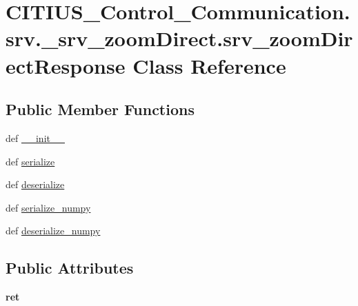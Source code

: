 \hypertarget{class_c_i_t_i_u_s___control___communication_1_1srv_1_1__srv__zoom_direct_1_1srv__zoom_direct_response}{\section{\-C\-I\-T\-I\-U\-S\-\_\-\-Control\-\_\-\-Communication.\-srv.\-\_\-srv\-\_\-zoom\-Direct.\-srv\-\_\-zoom\-Direct\-Response \-Class \-Reference}
\label{class_c_i_t_i_u_s___control___communication_1_1srv_1_1__srv__zoom_direct_1_1srv__zoom_direct_response}
}
\subsection*{\-Public \-Member \-Functions}
\begin{DoxyCompactItemize}
\item 
def \hyperlink{class_c_i_t_i_u_s___control___communication_1_1srv_1_1__srv__zoom_direct_1_1srv__zoom_direct_response_a1d389804d3151431233b57c0e249b71a}{\-\_\-\-\_\-init\-\_\-\-\_\-}
\item 
def \hyperlink{class_c_i_t_i_u_s___control___communication_1_1srv_1_1__srv__zoom_direct_1_1srv__zoom_direct_response_af896cc808c16691134cea64dc5f87729}{serialize}
\item 
def \hyperlink{class_c_i_t_i_u_s___control___communication_1_1srv_1_1__srv__zoom_direct_1_1srv__zoom_direct_response_ae158c3f8915a4008de44492544191a4e}{deserialize}
\item 
def \hyperlink{class_c_i_t_i_u_s___control___communication_1_1srv_1_1__srv__zoom_direct_1_1srv__zoom_direct_response_a03500c731ac2850c892e61a1d8ece8f9}{serialize\-\_\-numpy}
\item 
def \hyperlink{class_c_i_t_i_u_s___control___communication_1_1srv_1_1__srv__zoom_direct_1_1srv__zoom_direct_response_abeea783c97af18c3ed509fffbe8f959a}{deserialize\-\_\-numpy}
\end{DoxyCompactItemize}
\subsection*{\-Public \-Attributes}
\begin{DoxyCompactItemize}
\item 
\hypertarget{class_c_i_t_i_u_s___control___communication_1_1srv_1_1__srv__zoom_direct_1_1srv__zoom_direct_response_a342fac06e7895c1ff55e867959c971cc}{{\bfseries ret}}\label{class_c_i_t_i_u_s___control___communication_1_1srv_1_1__srv__zoom_direct_1_1srv__zoom_direct_response_a342fac06e7895c1ff55e867959c971cc}

\end{DoxyCompactItemize}
